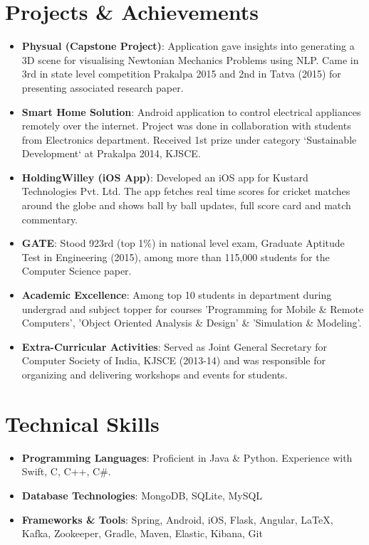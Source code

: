 \documentclass[letterpaper,11pt]{article}
\newcommand{\resumeItem}[2]{
  \item\small{
    \textbf{#1}{: #2 \vspace{-2pt}}
  }
}
\newcommand{\resumeSubItem}[2]{\resumeItem{#1}{#2}\vspace{-4pt}}
\newcommand{\resumeSubHeadingListStart}{\begin{itemize}[leftmargin=*]}
\newcommand{\resumeSubHeadingListEnd}{\end{itemize}}
\begin{document}
\section{Projects \& Achievements}
  \resumeSubHeadingListStart
    \resumeSubItem{Physual (Capstone Project)}
      {Application gave insights into generating a 3D scene for visualising Newtonian Mechanics Problems using NLP. Came in 3rd in state level competition Prakalpa 2015 and 2nd in Tatva (2015) for presenting associated research paper.}
    \resumeSubItem{Smart Home Solution}
      {Android application to control electrical appliances remotely over the internet. Project was done in collaboration with students from Electronics department. Received 1st prize under category ‘Sustainable Development‘ at Prakalpa 2014, KJSCE.}
    \resumeSubItem{HoldingWilley (iOS App)}
      { Developed an iOS app for Kustard Technologies Pvt. Ltd. The app fetches real time scores for cricket matches around the globe and shows ball by ball updates, full score card and match commentary.}
    \resumeSubItem{GATE}
      {Stood 923rd (top 1\%) in national level exam, Graduate Aptitude Test in Engineering (2015), among more than 115,000 students for the Computer Science paper.}
    \resumeSubItem{Academic Excellence}
	  {Among top 10 students in department during undergrad and subject topper for courses 'Programming for Mobile \& Remote Computers', 'Object Oriented Analysis \& Design' \&  'Simulation \& Modeling'.}
    \resumeSubItem{Extra-Curricular Activities}
      {Served as Joint General Secretary for Computer Society of India, KJSCE (2013-14) and was responsible for organizing and delivering workshops and events for students.}
  \resumeSubHeadingListEnd


\section{Technical Skills}
  \resumeSubHeadingListStart
    \item{
      \textbf{Programming Languages}{: Proficient in Java \& Python. Experience with Swift, C, C++, C\#.}}
  \vspace{-8pt}
	\item{
      \textbf{Database Technologies}{: MongoDB, SQLite, MySQL}}
  \vspace{-8pt}
	\item{
	  \textbf{Frameworks \& Tools}{: Spring, Android, iOS, Flask, Angular, \LaTeX, Kafka, Zookeeper, Gradle, Maven, Elastic, Kibana, Git}}
  \resumeSubHeadingListEnd


\end{document}
